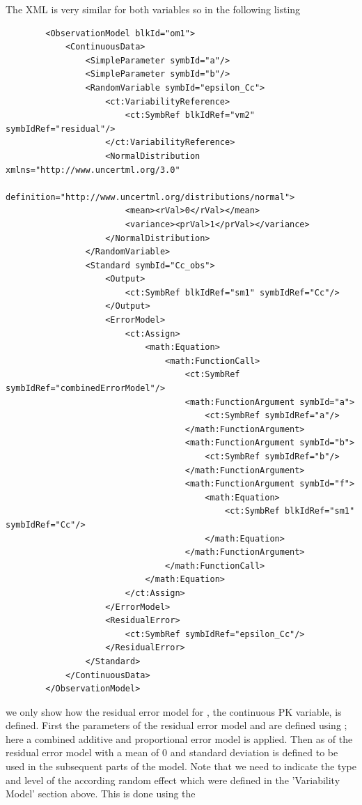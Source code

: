 The XML is very similar for both variables so in the following listing 
\lstset{language=XML}
\begin{lstlisting}
        <ObservationModel blkId="om1">
            <ContinuousData>
                <SimpleParameter symbId="a"/>
                <SimpleParameter symbId="b"/>
                <RandomVariable symbId="epsilon_Cc">
                    <ct:VariabilityReference>
                        <ct:SymbRef blkIdRef="vm2" symbIdRef="residual"/>
                    </ct:VariabilityReference>
                    <NormalDistribution xmlns="http://www.uncertml.org/3.0" 
                    	definition="http://www.uncertml.org/distributions/normal">
                        <mean><rVal>0</rVal></mean>
                        <variance><prVal>1</prVal></variance>
                    </NormalDistribution>
                </RandomVariable>
                <Standard symbId="Cc_obs">
                    <Output>
                        <ct:SymbRef blkIdRef="sm1" symbIdRef="Cc"/>
                    </Output>
                    <ErrorModel>
                        <ct:Assign>
                            <math:Equation>
                                <math:FunctionCall>
                                    <ct:SymbRef symbIdRef="combinedErrorModel"/>
                                    <math:FunctionArgument symbId="a">
                                        <ct:SymbRef symbIdRef="a"/>
                                    </math:FunctionArgument>
                                    <math:FunctionArgument symbId="b">
                                        <ct:SymbRef symbIdRef="b"/>
                                    </math:FunctionArgument>
                                    <math:FunctionArgument symbId="f">
                                        <math:Equation>
                                            <ct:SymbRef blkIdRef="sm1" symbIdRef="Cc"/>
                                        </math:Equation>
                                    </math:FunctionArgument>
                                </math:FunctionCall>
                            </math:Equation>
                        </ct:Assign>
                    </ErrorModel>
                    <ResidualError>
                        <ct:SymbRef symbIdRef="epsilon_Cc"/>
                    </ResidualError>
                </Standard>
            </ContinuousData>
        </ObservationModel>
\end{lstlisting}

we only show how the residual error model for , the continuous PK variable, is defined.
First the parameters of the residual error model  and  are
defined using ; here a combined additive
and proportional error model is applied. Then  as 
of the residual error model with a mean of $0$ and standard deviation  is defined
to be used in the subsequent parts of the model. Note that we need to 
indicate the type and level of the according random effect which were
defined in the 'Variability Model' section above. This is done
using the  

